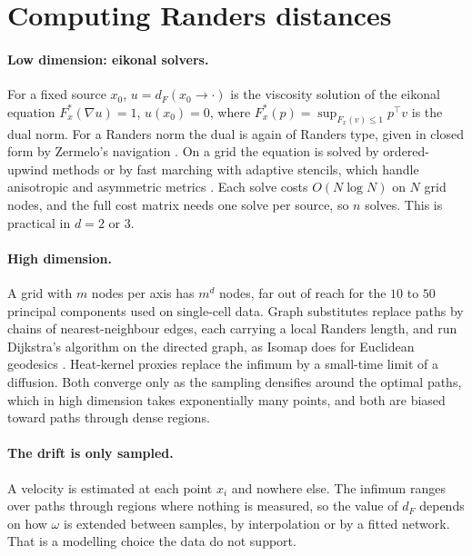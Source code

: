 \section{Computing Randers distances}
\label{app:randers}

\paragraph{Low dimension: eikonal solvers.}
For a fixed source $x_0$, $u=d_F(x_0\to\cdot)$ is the viscosity solution
of the eikonal equation $F^*_x(\nabla u)=1$, $u(x_0)=0$, where
$F^*_x(p)=\sup_{F_x(v)\le1}p^\top v$ is the dual norm. For a Randers norm
the dual is again of Randers type, given in closed form by Zermelo's
navigation \citep{bao2000introduction}. On a grid the equation is solved
by ordered-upwind methods \citep{sethian2003ordered} or by fast marching
with adaptive stencils, which handle anisotropic and asymmetric metrics
\citep{mirebeau2014efficient}. Each solve costs $O(N\log N)$ on $N$ grid
nodes, and the full cost matrix needs one solve per source, so $n$ solves.
This is practical in $d=2$ or $3$.

\paragraph{High dimension.}
A grid with $m$ nodes per axis has $m^d$ nodes, far out of reach for the
$10$ to $50$ principal components used on single-cell data. Graph
substitutes replace paths by chains of nearest-neighbour edges, each
carrying a local Randers length, and run Dijkstra's algorithm on the
directed graph, as Isomap does for Euclidean geodesics
\citep{tenenbaum2000global}. Heat-kernel proxies replace the infimum by a
small-time limit of a diffusion. Both converge only as the sampling
densifies around the optimal paths, which in high dimension takes
exponentially many points, and both are biased toward paths through
dense regions.

\paragraph{The drift is only sampled.}
A velocity is estimated at each point $x_i$ and nowhere else. The
infimum ranges over paths through regions where nothing is measured, so
the value of $d_F$ depends on how $\omega$ is extended between samples,
by interpolation or by a fitted network. That is a modelling choice the
data do not support.

